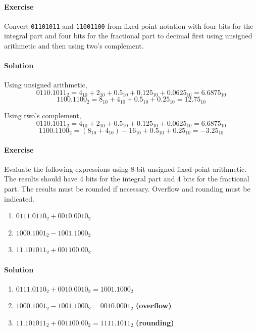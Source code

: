 \documentclass[oneside]{book} %
\theoremstyle{plain}
\begin{document}
\paragraph{Exercise} Convert \texttt{01101011} and \texttt{11001100} from fixed
point notation with four bits for the integral part and four bits for the
fractional part to decimal first using unsigned arithmetic and then using two's
complement.

\paragraph{Solution} Using unsigned arithmetic,
\[0110.1011_{2} = 4_{10} + 2_{10} + 0.5_{10} + 0.125_{10} + 0.0625_{10}
  = 6.6875_{10}\]
\[1100.1100_{2} = 8_{10} + 4_{10} + 0.5_{10} + 0.25_{10} = 12.75_{10}\]

Using two's complement,
\[0110.1011_{2} = 4_{10} + 2_{10} + 0.5_{10} + 0.125_{10} + 0.0625_{10}
 = 6.6875_{10}\]
\[1100.1100_{2} = \left( 8_{10} + 4_{10} \right) - 16_{10} + 0.5_{10}
 + 0.25_{10} = -3.25_{10}\]

\paragraph{Exercise} Evaluate the following expressions using 8-bit unsigned
fixed point arithmetic. The results should have 4 bits for the integral part and
4 bits for the fractional part. The results must be rounded if necessary.
Overflow and rounding must be indicated.

\begin{enumerate}
    \item \(0111.0110_{2} + 0010.0010_{2}\)
    \item \(1000.1001_{2} - 1001.1000_{2}\)
    \item \(11.101011_{2} + 001100.00_{2}\)
\end{enumerate}

\paragraph{Solution}

\begin{enumerate}
    \item \(0111.0110_{2} + 0010.0010_{2} = 1001.1000_{2}\)
    \item \(1000.1001_{2} - 1001.1000_{2} = 0010.0001_{2}\) \textbf{(overflow)}
    \item \(11.101011_{2} + 001100.00_{2} = 1111.1011_{2}\) \textbf{(rounding)}
\end{enumerate}
\end{document}
